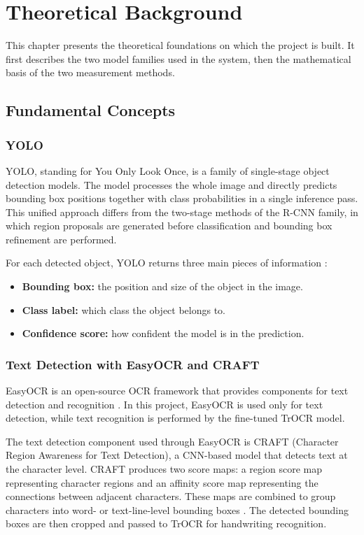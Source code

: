 \chapter{Theoretical Background}
\label{chap:theoretical_background}

This chapter presents the theoretical foundations on which the project is built. It first describes the two model families used in the system, then the mathematical basis of the two measurement methods.

\section{Fundamental Concepts}

\subsection{YOLO}

YOLO, standing for You Only Look Once, is a family of single-stage object detection models. The model processes the whole image and directly predicts bounding box positions together with class probabilities in a single inference pass. This unified approach differs from the two-stage methods of the R-CNN family, in which region proposals are generated before classification and bounding box refinement are performed.

For each detected object, YOLO returns three main pieces of information \cite{redmon2016}:

\begin{itemize}
    \item \textbf{Bounding box:} the position and size of the object in the image.
    \item \textbf{Class label:} which class the object belongs to.
    \item \textbf{Confidence score:} how confident the model is in the prediction.
\end{itemize}

\subsection{Text Detection with EasyOCR and CRAFT}

EasyOCR is an open-source OCR framework that provides components for text detection and recognition \cite{easyocr}. In this project, EasyOCR is used only for text detection, while text recognition is performed by the fine-tuned TrOCR model.

The text detection component used through EasyOCR is CRAFT (Character Region Awareness for Text Detection), a CNN-based model that detects text at the character level. CRAFT produces two score maps: a region score map representing character regions and an affinity score map representing the connections between adjacent characters. These maps are combined to group characters into word- or text-line-level bounding boxes \cite{baek2019craft}. The detected bounding boxes are then cropped and passed to TrOCR for handwriting recognition.

